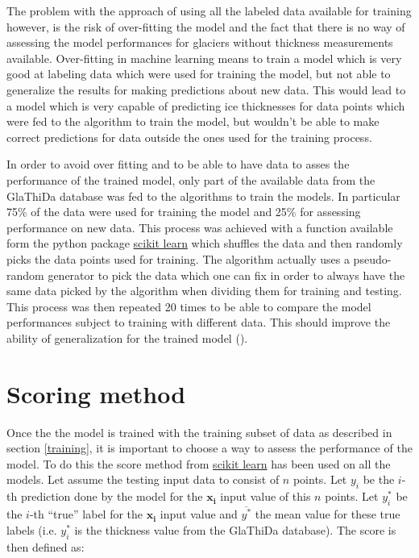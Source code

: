 The problem with the approach of using all the labeled data available for training however, is the risk of over-fitting the model and the fact that there is no way of assessing the model performances for glaciers without thickness measurements available.
Over-fitting in machine learning means to train a model which is very good at labeling data which were used for training the model, but not able to generalize the results for making predictions about new data. This would lead to a model which is very capable of predicting ice thicknesses for data points which were fed to the algorithm to train the model, but wouldn't be able to make correct predictions for data outside the ones used for the training process. 

In order to avoid over fitting and to be able to have data to asses the performance of the trained model, only part of the available data from the GlaThiDa database was fed to the algorithms to train the models. In particular 75\% of the data were used for training the model and 25\% for assessing performance on new data. This process was achieved with a function available form the python package \href{https://scikit-learn.org/}{scikit learn} which shuffles the data and then randomly picks the data points used for training. The algorithm actually uses a pseudo-random generator to pick the data which one can fix in order to always  have the same data picked by the algorithm when dividing them for training and testing. This process was then repeated 20 times to be able to compare the model performances subject to training with different data. This should improve the ability of generalization for the trained model (\citet{crossval1995}).

\section{Scoring method}\label{scoring}
Once the the model is trained with the training subset of data as described in section \ref{training}, it is important to choose a way to assess the performance of the model. To do this the score method from \href{https://scikit-learn.org/}{scikit learn} has been used on all the models. Let assume the testing input data to consist of $n$ points. Let $y_i$ be the $i$-th prediction done by the model for the $\mathbf{x_i}$ input value of this $n$ points. Let $y^*_i$ be the $i$-th ``true'' label for the $\mathbf{x_i}$ input value and $\overline{y^*}$ the mean value for these true labels (i.e. $y^*_i$ is the thickness value from the GlaThiDa database). The score is then defined as:

